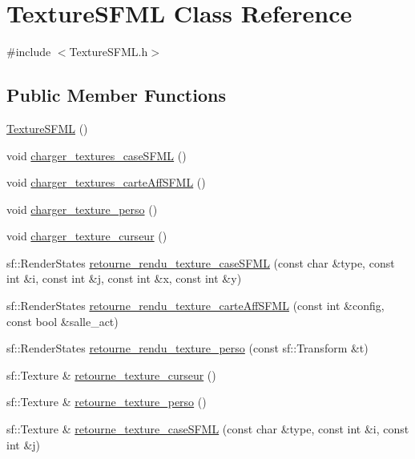\hypertarget{classTextureSFML}{}\section{Texture\+S\+F\+ML Class Reference}
\label{classTextureSFML}


{\ttfamily \#include $<$Texture\+S\+F\+M\+L.\+h$>$}

\subsection*{Public Member Functions}
\begin{DoxyCompactItemize}
\item 
\hyperlink{classTextureSFML_af140d180a2ab08c7c8eda5b38f3fb653}{Texture\+S\+F\+ML} ()
\item 
void \hyperlink{classTextureSFML_a0e4fcc15c683b6dc2edb4fdfa04c9b74}{charger\+\_\+textures\+\_\+case\+S\+F\+ML} ()
\item 
void \hyperlink{classTextureSFML_ac9a80a9ca433817596a40c0a250d298d}{charger\+\_\+textures\+\_\+carte\+Aff\+S\+F\+ML} ()
\item 
void \hyperlink{classTextureSFML_af90a280cc0da676e3888edb5e0863911}{charger\+\_\+texture\+\_\+perso} ()
\item 
void \hyperlink{classTextureSFML_a7f5271af1e129ecb4e17ceee400802cc}{charger\+\_\+texture\+\_\+curseur} ()
\item 
sf\+::\+Render\+States \hyperlink{classTextureSFML_aa53677d04e938b2aab93706f4e418510}{retourne\+\_\+rendu\+\_\+texture\+\_\+case\+S\+F\+ML} (const char \&type, const int \&i, const int \&j, const int \&x, const int \&y)
\item 
sf\+::\+Render\+States \hyperlink{classTextureSFML_ad7b34fb7ef06ae789c2b608c3d2e73eb}{retourne\+\_\+rendu\+\_\+texture\+\_\+carte\+Aff\+S\+F\+ML} (const int \&config, const bool \&salle\+\_\+act)
\item 
sf\+::\+Render\+States \hyperlink{classTextureSFML_a18df93a994a6343b6aea26d6e397cb1c}{retourne\+\_\+rendu\+\_\+texture\+\_\+perso} (const sf\+::\+Transform \&t)
\item 
sf\+::\+Texture \& \hyperlink{classTextureSFML_ab5c8aa79baa997e736ba3c43babd314e}{retourne\+\_\+texture\+\_\+curseur} ()
\item 
sf\+::\+Texture \& \hyperlink{classTextureSFML_a956e5bfd50966a426efed6c8eee16645}{retourne\+\_\+texture\+\_\+perso} ()
\item 
sf\+::\+Texture \& \hyperlink{classTextureSFML_a3daf2e9be9966e9d597acec83c12372b}{retourne\+\_\+texture\+\_\+case\+S\+F\+ML} (const char \&type, const int \&i, const int \&j)
\end{DoxyCompactItemize}


